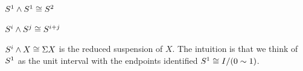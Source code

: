 \begin{example}
$S^{1}\mathbin{\wedge}S^{1}\cong S^{2}$
\end{example}

\begin{example}
$S^{i}\mathbin{\wedge}S^{j}\cong S^{i+j}$
\end{example}

\begin{example}
$S^{i}\mathbin{\wedge} X\cong\Sigma X$ is the reduced suspension of $X$.
The intuition is that we think of $S^{1}$ as the unit interval
with the endpoints identified $S^{1}\cong I/(0\sim 1)$. 
\end{example}
